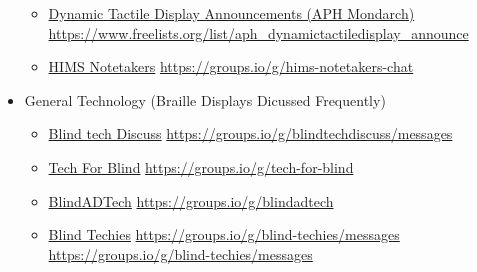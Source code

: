 \documentclass[14pt,letterpaper,twoside]{extreport}
\begin{document}
\begin{appendices}
\begin{itemize}[leftmargin=*]
\begin{itemize}[leftmargin=2em]
\item \href{https://www.freelists.org/list/aph_dynamictactiledisplay_announce}{Dynamic Tactile Display Announcements (APH Mondarch)}  \break\url{https://www.freelists.org/list/aph_dynamictactiledisplay_announce}
\item \href{https://groups.io/g/hims-notetakers-chat}{HIMS Notetakers}  \break\url{https://groups.io/g/hims-notetakers-chat}
\end{itemize}
\item General Technology (Braille Displays Dicussed Frequently)
\begin{itemize}[leftmargin=2em]
\item \href{https://groups.io/g/blindtechdiscuss/messages}{Blind tech Discuss}  \break\url{https://groups.io/g/blindtechdiscuss/messages}
\item \href{https://groups.io/g/tech-for-blind}{Tech For Blind}  \break\url{https://groups.io/g/tech-for-blind}
\item \href{https://groups.io/g/blindadtech}{BlindADTech}  \break\url{https://groups.io/g/blindadtech}
\item \href{https://groups.io/g/blind-techies/messages}{Blind Techies}  \break\url{https://groups.io/g/blind-techies/messages}  \break\url{https://groups.io/g/blind-techies/messages}
\end{itemize}
\end{itemize}
\end{appendices}
\pagebreak
\end{document}
